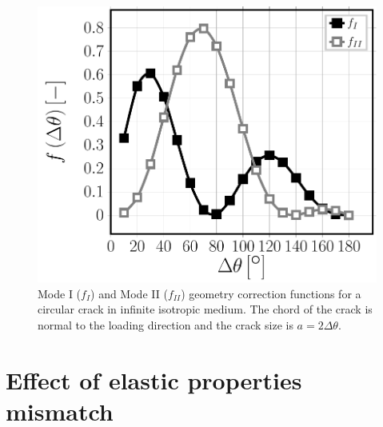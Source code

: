 \documentclass[review]{elsarticle}
\begin{document}
\begin{figure}
\includegraphics[width=\textwidth]{curvedcracks.pdf}
\caption{Mode I ($f_{I}$) and Mode II ($f_{II}$) geometry correction functions for a circular crack in infinite isotropic medium. The chord of the crack is normal to the loading direction and the crack size is $a=2\Delta\theta$.}\label{fig:curvedcrackgeomcorr}
\end{figure}

\section{Effect of elastic properties mismatch}
\end{document}
